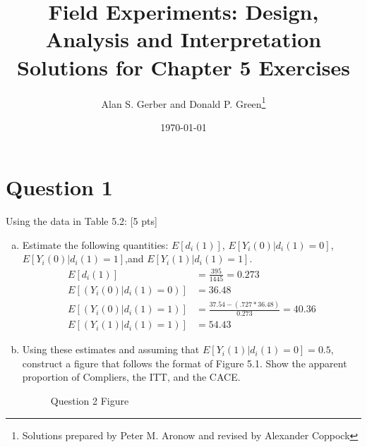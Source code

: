 \documentclass[11pt,notitlepage]{article}\usepackage[]{graphicx}\usepackage[]{color}
\title{Field Experiments: Design, Analysis and Interpretation \\
Solutions for Chapter 5 Exercises}
\author{Alan S. Gerber and Donald P. Green\footnote{Solutions prepared by Peter M. Aronow and revised by Alexander Coppock}}
\date{\today}
\begin{document}
\maketitle

\section*{Question 1}
Using the data in Table 5.2: [5 pts]
\begin{enumerate}[a)]
\item Estimate the following quantities: $E[d_i(1)]$, $E[Y_i(0)|d_i(1) = 0]$, $E[Y_i(0)| d_i(1) = 1]$,and $E[Y_i(1)|d_i(1)=1]$.\\
\begin{align*}
E[d_i(1)] &= \frac{395}{1445} = 0.273\\
E[(Y_i(0)|d_i(1) = 0)] &= 36.48\\
E[(Y_i(0)|d_i(1) = 1)] &= \frac{37.54 - (.727*36.48)}{0.273} = 40.36\\
E[(Y_i(1)|d_i(1) = 1)] &= 54.43
\end{align*}

\item Using these estimates and assuming that $E[Y_i(1)|d_i(1) = 0] = 0.5$, construct a figure that follows the format of Figure 5.1. Show the apparent proportion of Compliers, the ITT, and the CACE.

\begin{figure}[H]
    \centering
        \caption{Question 2 Figure}
    \qquad
\end{figure}

\end{enumerate}
\end{document}
